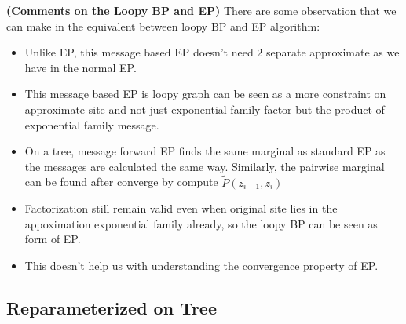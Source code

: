 \begin{remark}{\textbf{(Comments on the Loopy BP and EP)}}
    There are some observation that we can make in the equivalent between loopy BP and EP algorithm:
    \begin{itemize}
        \item Unlike EP, this message based EP doesn't need $2$ separate approximate as we have in the normal EP.
        \item This message based EP is loopy graph can be seen as a more constraint on approximate site and not just exponential family factor but the product of exponential family message. 
        \item On a tree, message forward EP finds the same marginal as standard EP as the messages are calculated the same way. Similarly, the pairwise marginal can be found after converge by compute $\tilde{P}(z_{i - 1}, z_i)$
        \item Factorization still remain valid even when original site lies in the appoximation exponential family already, so the loopy BP can be seen as form of EP. 
        \item This doesn't help us with understanding the convergence property of EP.
    \end{itemize}
\end{remark}

\subsection{Reparameterized on Tree}

